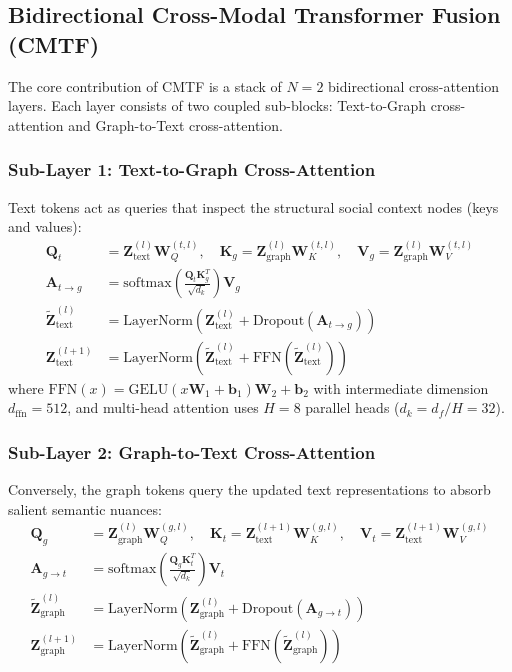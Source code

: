 \documentclass[conference]{IEEEtran}
\begin{document}
\subsection{Bidirectional Cross-Modal Transformer Fusion (CMTF)}
The core contribution of CMTF is a stack of $N=2$ bidirectional cross-attention layers. Each layer consists of two coupled sub-blocks: Text-to-Graph cross-attention and Graph-to-Text cross-attention.

\subsubsection{Sub-Layer 1: Text-to-Graph Cross-Attention}
Text tokens act as queries that inspect the structural social context nodes (keys and values):
\begin{align}
\mathbf{Q}_t &= \mathbf{Z}_{\text{text}}^{(l)} \mathbf{W}_Q^{(t, l)}, \quad \mathbf{K}_g = \mathbf{Z}_{\text{graph}}^{(l)} \mathbf{W}_K^{(t, l)}, \quad \mathbf{V}_g = \mathbf{Z}_{\text{graph}}^{(l)} \mathbf{W}_V^{(t, l)} \\
\mathbf{A}_{t \to g} &= \text{softmax}\left(\frac{\mathbf{Q}_t \mathbf{K}_g^T}{\sqrt{d_k}}\right) \mathbf{V}_g \\
\mathbf{\tilde{Z}}_{\text{text}}^{(l)} &= \text{LayerNorm}\left(\mathbf{Z}_{\text{text}}^{(l)} + \text{Dropout}(\mathbf{A}_{t \to g})\right) \\
\mathbf{Z}_{\text{text}}^{(l+1)} &= \text{LayerNorm}\left(\mathbf{\tilde{Z}}_{\text{text}}^{(l)} + \text{FFN}(\mathbf{\tilde{Z}}_{\text{text}}^{(l)})\right)
\end{align}
where $\text{FFN}(x) = \text{GELU}(x \mathbf{W}_1 + \mathbf{b}_1) \mathbf{W}_2 + \mathbf{b}_2$ with intermediate dimension $d_{\text{ffn}} = 512$, and multi-head attention uses $H=8$ parallel heads ($d_k = d_f / H = 32$).

\subsubsection{Sub-Layer 2: Graph-to-Text Cross-Attention}
Conversely, the graph tokens query the updated text representations to absorb salient semantic nuances:
\begin{align}
\mathbf{Q}_g &= \mathbf{Z}_{\text{graph}}^{(l)} \mathbf{W}_Q^{(g, l)}, \quad \mathbf{K}_t = \mathbf{Z}_{\text{text}}^{(l+1)} \mathbf{W}_K^{(g, l)}, \quad \mathbf{V}_t = \mathbf{Z}_{\text{text}}^{(l+1)} \mathbf{W}_V^{(g, l)} \\
\mathbf{A}_{g \to t} &= \text{softmax}\left(\frac{\mathbf{Q}_g \mathbf{K}_t^T}{\sqrt{d_k}}\right) \mathbf{V}_t \\
\mathbf{\tilde{Z}}_{\text{graph}}^{(l)} &= \text{LayerNorm}\left(\mathbf{Z}_{\text{graph}}^{(l)} + \text{Dropout}(\mathbf{A}_{g \to t})\right) \\
\mathbf{Z}_{\text{graph}}^{(l+1)} &= \text{LayerNorm}\left(\mathbf{\tilde{Z}}_{\text{graph}}^{(l)} + \text{FFN}(\mathbf{\tilde{Z}}_{\text{graph}}^{(l)})\right)
\end{align}
\end{document}
